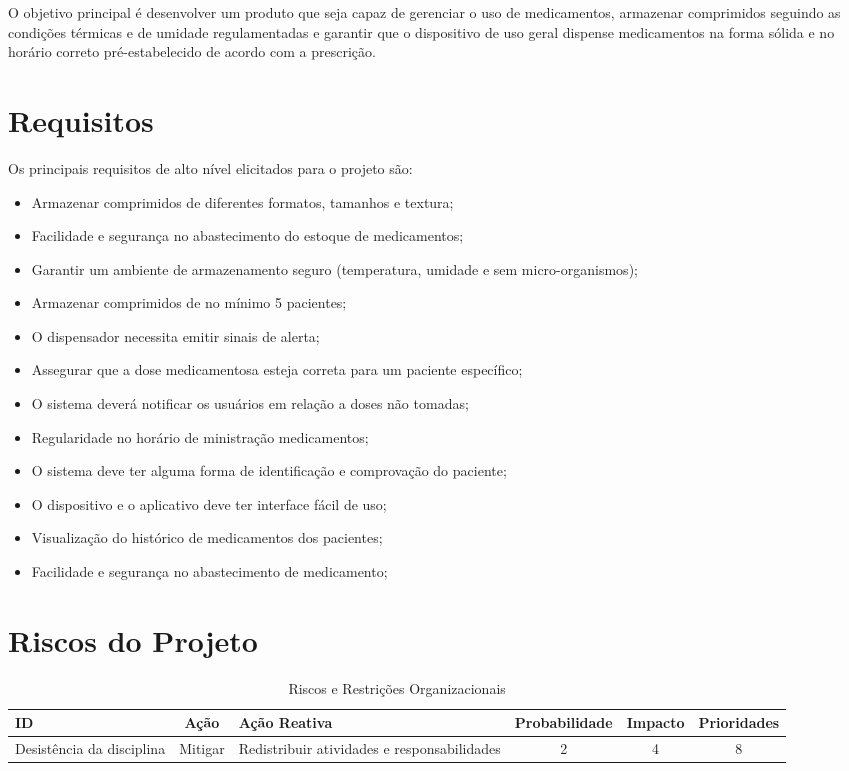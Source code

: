 \begin{apendicesenv}
O objetivo principal é desenvolver um produto que seja capaz de gerenciar o uso de medicamentos, armazenar comprimidos seguindo as condições térmicas e de umidade regulamentadas e garantir que o dispositivo de uso geral dispense medicamentos na forma sólida e no horário correto pré-estabelecido de acordo com a prescrição. 


\section{Requisitos}
Os principais requisitos de alto nível elicitados para o projeto são:

\begin{itemize}
\item Armazenar comprimidos de diferentes formatos, tamanhos e textura;
\item Facilidade e segurança no abastecimento do estoque de medicamentos;
\item Garantir um ambiente de armazenamento seguro (temperatura, umidade e sem micro-organismos);
\item Armazenar comprimidos de no mínimo 5 pacientes;
\item O dispensador necessita emitir sinais de alerta;
\item Assegurar que a dose medicamentosa esteja correta para um paciente específico;
\item O sistema deverá notificar os usuários em relação a doses não tomadas;
\item Regularidade no horário de ministração medicamentos;
\item O sistema deve ter alguma forma de identificação e comprovação do paciente;
\item O dispositivo e o aplicativo deve ter interface fácil de uso;
\item Visualização do histórico de medicamentos dos pacientes;
\item Facilidade e segurança no abastecimento de medicamento;
\end{itemize}

\section{Riscos do Projeto}

\begin{table}[H]
    \centering
    \caption{Riscos e Restrições Organizacionais}
    \label{tab:tap-riscos}
    \begin{adjustbox}{max width = \textwidth}
        \begin{tabular}{|L{5cm}|c|L{4cm}|c|c|c|}
            \hline
            \textbf{ID} & \textbf{Ação} & \textbf{Ação Reativa} & \textbf{Probabilidade} & \textbf{Impacto} & \textbf{Prioridades}\\ \hline
             Desistência da disciplina  & Mitigar & Redistribuir atividades e responsabilidades & 2 & 4 & 8 \\ \hline
        

\end{tabular}
\end{adjustbox}
\end{table}
\end{apendicesenv}
